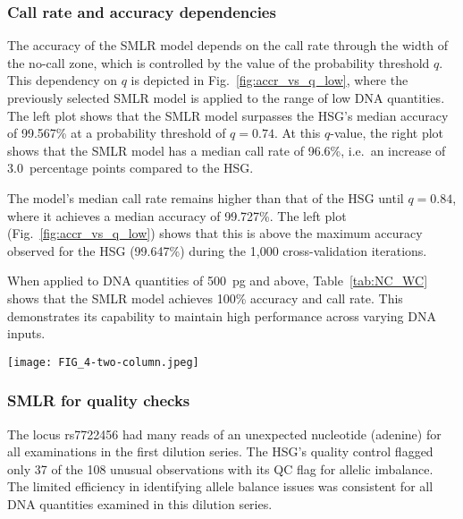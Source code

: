 \documentclass[preprint,5p,times,11pt]{elsarticle}
\begin{document}
\subsubsection{Call rate and accuracy dependencies}
The accuracy of the SMLR model depends on the call rate through the width of the no-call zone, which is controlled by the value of the probability threshold $q$.
This dependency on $q$ is depicted in Fig.~\ref{fig:accr_vs_q_low}, where the previously selected SMLR model is applied to the range of low DNA quantities.
The left plot shows that the SMLR model surpasses the HSG's median accuracy of 99.567\% at a probability threshold of $q=0.74$.
At this $q$-value, the right plot shows that the SMLR model has a median call rate of 96.6\%, i.e.~an increase of 3.0~percentage points compared to the HSG.

The model's median call rate remains higher than that of the HSG until $q=0.84$, where it achieves a median accuracy of 99.727\%.
The left plot (Fig.~\ref{fig:accr_vs_q_low}) shows that this is above the maximum accuracy observed for the HSG (99.647\%) during the 1,000 cross-validation iterations.

When applied to DNA quantities of \SI{500}{\pg} and above, Table~\ref{tab:NC_WC} shows that the SMLR model achieves 100\% accuracy and call rate.
This demonstrates its capability to maintain high performance across varying DNA inputs.
\begin{figure*}
\centering
\texttt{[image: FIG\_4-two-column.jpeg]}
\caption{
Performance of the SMLR model across probability thresholds, $q$ (legend applies to both plots).\\
The grey lines depict the SMLR model's performance in 1,000 cross-validation iterations.
The model was fitted with an intercept to square-root transformed allele signals and tested on data from the examinations of the DNA quantities indicated above the plots.
Dotted lines mark the 25th and 75th percentiles among the 1,000 cross-validations, while dashed lines indicate medians.
The shaded horizontal bars represent the accuracy~(left) and call rate~(right) ranges for the HID SNP Genotyper Plugin.
}
\label{fig:accr_vs_q_low}
\end{figure*}


\subsubsection{SMLR for quality checks}
The locus rs7722456 had many reads of an unexpected nucleotide (adenine) for all examinations in the first dilution series.
The HSG's quality control flagged only 37 of the 108 unusual observations with its QC flag for allelic imbalance.
The limited efficiency in identifying allele balance issues was consistent for all DNA quantities examined in this dilution series.
\end{document}
